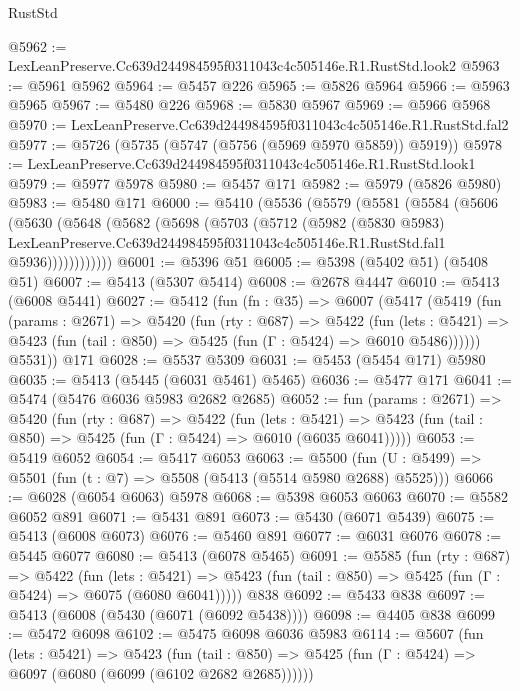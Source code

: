 \begin{lexlean}{RustStd}
\begin{coremodule}
@5962 := LexLeanPreserve.Cc639d244984595f0311043c4c505146e.R1.RustStd.look2
@5963 := @5961 @5962
@5964 := @5457 @226
@5965 := @5826 @5964
@5966 := @5963 @5965
@5967 := @5480 @226
@5968 := @5830 @5967
@5969 := @5966 @5968
@5970 := LexLeanPreserve.Cc639d244984595f0311043c4c505146e.R1.RustStd.fal2
@5977 := @5726 (@5735 (@5747 (@5756 (@5969 @5970 @5859)) @5919))
@5978 := LexLeanPreserve.Cc639d244984595f0311043c4c505146e.R1.RustStd.look1
@5979 := @5977 @5978
@5980 := @5457 @171
@5982 := @5979 (@5826 @5980)
@5983 := @5480 @171
@6000 := @5410
    (@5536
      (@5579
        (@5581
          (@5584
            (@5606
              (@5630
                (@5648
                  (@5682
                    (@5698
                      (@5703
                        (@5712
                          (@5982
                            (@5830 @5983)
                            LexLeanPreserve.Cc639d244984595f0311043c4c505146e.R1.RustStd.fal1
                            @5936))))))))))))
@6001 := @5396 @51
@6005 := @5398 (@5402 @51) (@5408 @51)
@6007 := @5413 (@5307 @5414)
@6008 := @2678 @4447
@6010 := @5413 (@6008 @5441)
@6027 := @5412
    (fun (fn : @35) =>
    @6007
      (@5417
        (@5419
          (fun (params : @2671) =>
          @5420
            (fun (rty : @687) =>
            @5422
              (fun (lets : @5421) =>
              @5423 (fun (tail : @850) => @5425 (fun (Γ : @5424) => @6010 @5486))))))
        @5531))
    @171
@6028 := @5537 @5309
@6031 := @5453 (@5454 @171) @5980
@6035 := @5413 (@5445 (@6031 @5461) @5465)
@6036 := @5477 @171
@6041 := @5474 (@5476 @6036 @5983 @2682 @2685)
@6052 := fun (params : @2671) =>
  @5420
    (fun (rty : @687) =>
    @5422
      (fun (lets : @5421) =>
      @5423 (fun (tail : @850) => @5425 (fun (Γ : @5424) => @6010 (@6035 @6041)))))
@6053 := @5419 @6052
@6054 := @5417 @6053
@6063 := @5500 (fun (U : @5499) => @5501 (fun (t : @7) => @5508 (@5413 (@5514 @5980 @2688) @5525)))
@6066 := @6028 (@6054 @6063) @5978
@6068 := @5398 @6053 @6063
@6070 := @5582 @6052 @891
@6071 := @5431 @891
@6073 := @5430 (@6071 @5439)
@6075 := @5413 (@6008 @6073)
@6076 := @5460 @891
@6077 := @6031 @6076
@6078 := @5445 @6077
@6080 := @5413 (@6078 @5465)
@6091 := @5585
    (fun (rty : @687) =>
    @5422
      (fun (lets : @5421) =>
      @5423 (fun (tail : @850) => @5425 (fun (Γ : @5424) => @6075 (@6080 @6041)))))
    @838
@6092 := @5433 @838
@6097 := @5413 (@6008 (@5430 (@6071 (@6092 @5438))))
@6098 := @4405 @838
@6099 := @5472 @6098
@6102 := @5475 @6098 @6036 @5983
@6114 := @5607
    (fun (lets : @5421) =>
    @5423
      (fun (tail : @850) => @5425 (fun (Γ : @5424) => @6097 (@6080 (@6099 (@6102 @2682 @2685))))))

\end{coremodule}
\end{lexlean}
